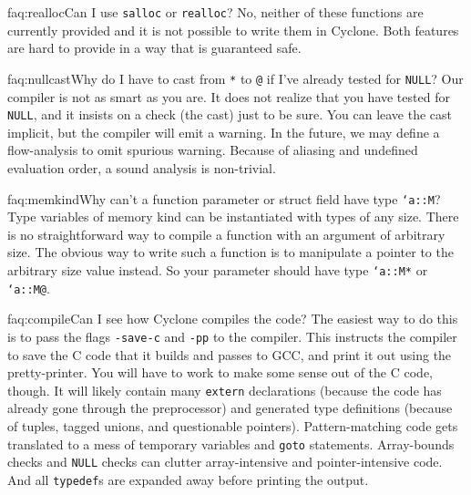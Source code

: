 \begin{faqa}{faq:realloc}{Can I use \texttt{salloc} or \texttt{realloc}?}
No, neither of these functions are currently provided and it is not
possible to write them in Cyclone.  Both features are hard to provide
in a way that is guaranteed safe.
\end{faqa}

\begin{faqa}{faq:nullcast}{Why do I have to cast from \texttt{*} to \texttt{@} if I've already tested for \texttt{NULL}?} 
Our compiler is not as smart as you are.  It does not realize that you
have tested for \texttt{NULL}, and it insists on a check (the cast)
just to be sure.  You can leave the cast implicit, but the compiler
will emit a warning.  In the future, we may define a flow-analysis to
omit spurious warning.  Because of aliasing and undefined evaluation
order, a sound analysis is non-trivial.
\end{faqa}

\begin{faqa}{faq:memkind}{Why can't a function parameter or struct field have type \texttt{`a::M}?} 
Type variables of memory kind can be instantiated with types of any
size.  There is no straightforward way to compile a function with an
argument of arbitrary size.  The obvious way to write such a function
is to manipulate a pointer to the arbitrary size value instead.  So
your parameter should have type \texttt{`a::M*} or \texttt{`a::M@}.
\end{faqa}

\begin{faqa}{faq:compile}{Can I see how Cyclone compiles the code?}
The easiest way to do this is to pass the flags \texttt{-save-c} and
\texttt{-pp} to the compiler.  This instructs the compiler to save the
C code that it builds and passes to GCC, and print it out using the
pretty-printer.  You will have to work to make some sense out of the C
code, though.  It will likely contain many \texttt{extern}
declarations (because the code has already gone through the
preprocessor) and generated type definitions (because of tuples,
tagged unions, and questionable pointers).  Pattern-matching code gets
translated to a mess of temporary variables and \texttt{goto}
statements.  Array-bounds checks and \texttt{NULL} checks can clutter
array-intensive and pointer-intensive code.  And all \texttt{typedef}s
are expanded away before printing the output.
\end{faqa}

